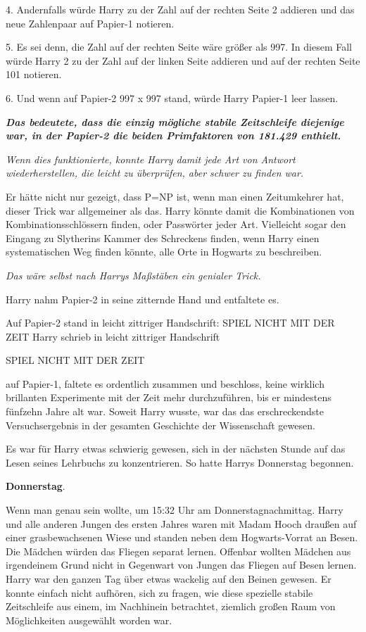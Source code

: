 4. Andernfalls würde Harry zu der Zahl auf der rechten Seite 2 addieren und das
neue Zahlenpaar auf Papier-1 notieren.

5. Es sei denn, die Zahl auf der rechten Seite wäre größer als 997. In diesem
Fall würde Harry 2 zu der Zahl auf der linken Seite addieren und auf der rechten
Seite 101 notieren.

6. Und wenn auf Papier-2 997 x 997 stand, würde Harry Papier-1 leer lassen.

\textbf{\emph{Das bedeutete, dass die einzig mögliche stabile Zeitschleife
diejenige war, in der Papier-2 die beiden Primfaktoren von 181.429 enthielt. }}

\emph{Wenn dies funktionierte, konnte Harry damit jede Art von Antwort
wiederherstellen, die leicht zu überprüfen, aber schwer zu finden war.}

Er hätte nicht nur gezeigt, dass P=NP ist, wenn man einen Zeitumkehrer hat,
dieser Trick war allgemeiner als das. Harry könnte damit die Kombinationen von
Kombinationsschlössern finden, oder Passwörter jeder Art. Vielleicht sogar den
Eingang zu Slytherins Kammer des Schreckens finden, wenn Harry einen
systematischen Weg finden könnte, alle Orte in Hogwarts zu beschreiben.

\emph{Das wäre selbst nach Harrys Maßstäben ein genialer Trick. }

Harry nahm Papier-2 in seine zitternde Hand und entfaltete es.

Auf Papier-2 stand in leicht zittriger Handschrift: SPIEL NICHT MIT DER ZEIT
Harry schrieb in leicht zittriger Handschrift

\glqq SPIEL NICHT MIT DER ZEIT\grqq{}

auf Papier-1, faltete es ordentlich zusammen und beschloss, keine wirklich
brillanten Experimente mit der Zeit mehr durchzuführen, bis er mindestens
fünfzehn Jahre alt war. Soweit Harry wusste, war das das erschreckendste
Versuchsergebnis in der gesamten Geschichte der Wissenschaft gewesen.

Es war für Harry etwas schwierig gewesen, sich in der nächsten Stunde auf das
Lesen seines Lehrbuchs zu konzentrieren. So hatte Harrys Donnerstag begonnen.

\textbf{Donnerstag}.

Wenn man genau sein wollte, um 15:32 Uhr am Donnerstagnachmittag. Harry und alle
anderen Jungen des ersten Jahres waren mit Madam Hooch draußen auf einer
grasbewachsenen Wiese und standen neben dem Hogwarts-Vorrat an Besen. Die
Mädchen würden das Fliegen separat lernen. Offenbar wollten Mädchen aus
irgendeinem Grund nicht in Gegenwart von Jungen das Fliegen auf Besen lernen.
Harry war den ganzen Tag über etwas wackelig auf den Beinen gewesen. Er konnte
einfach nicht aufhören, sich zu fragen, wie diese spezielle stabile Zeitschleife
aus einem, im Nachhinein betrachtet, ziemlich großen Raum von Möglichkeiten
ausgewählt worden war.

